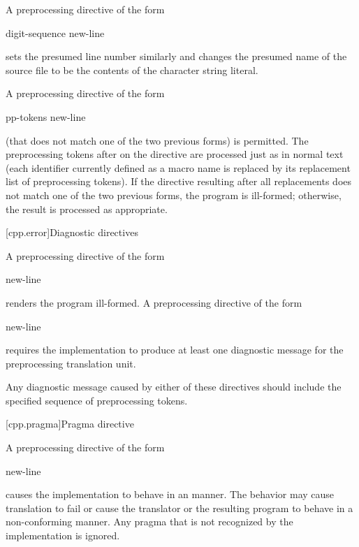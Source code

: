 \pnum
A preprocessing directive of the form
\begin{ncsimplebnf}
 digit-sequence    new-line
\end{ncsimplebnf}
sets the presumed line number similarly and changes the
presumed name of the source file to be the contents
of the character string literal.

\pnum
A preprocessing directive of the form
\begin{ncsimplebnf}
 pp-tokens new-line
\end{ncsimplebnf}
(that does not match one of the two previous forms)
is permitted.
The preprocessing tokens after
on the directive are processed just as in normal text
(each identifier currently defined as a macro name is replaced by its
replacement list of preprocessing tokens).
If the directive resulting after all replacements does not match
one of the two previous forms, the program is ill-formed;
otherwise, the result is processed as appropriate.

[cpp.error]{Diagnostic directives}%
%
%
%

\pnum
A preprocessing directive of the form
\begin{ncsimplebnf}
  new-line
\end{ncsimplebnf}
renders the program ill-formed.
A preprocessing directive of the form
\begin{ncsimplebnf}
  new-line
\end{ncsimplebnf}
requires the implementation to produce at least one diagnostic message
for the preprocessing translation unit.

\pnum
\recommended
Any diagnostic message caused by either of these directives
should include the specified sequence of preprocessing tokens.

[cpp.pragma]{Pragma directive}%
%

\pnum
A preprocessing directive of the form
\begin{ncsimplebnf}
  new-line
\end{ncsimplebnf}
causes the implementation to behave
in an  manner.
The behavior may cause translation to fail or cause the translator or
the resulting program to behave in a non-conforming manner.
Any pragma that is not recognized by the implementation is ignored.

